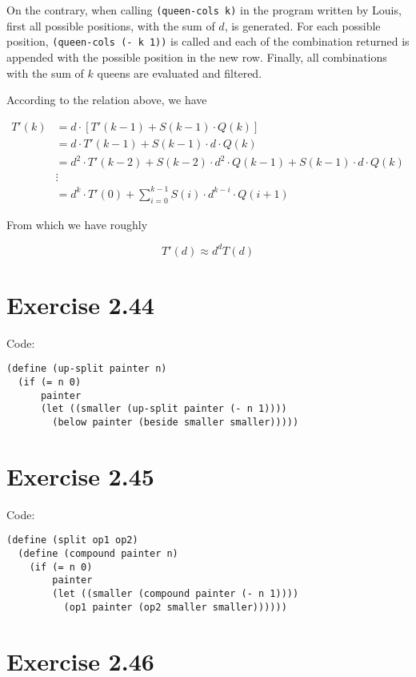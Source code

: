 \documentclass[../main.tex]{subfiles}
\begin{document}
On the contrary, when calling \lstinline{(queen-cols k)}
 in the program written by Louis, first all possible
 positions, with the sum of $d$, is generated. For each
 possible position, \lstinline{(queen-cols (- k 1))} is
 called and each of the combination returned is appended
 with the possible position in the new row. Finally,
 all combinations with the sum of $k$ queens are evaluated
 and filtered.

According to the relation above, we have

\begin{align*}
T'(k) &= d \cdot \left[T'(k-1) + S(k-1) \cdot Q(k)\right] \\
&= d \cdot T'(k-1) + S(k-1) \cdot d \cdot Q(k) \\
&= d^2 \cdot T'(k-2) + S(k-2) \cdot d^2 \cdot Q(k-1) + S(k-1) \cdot d \cdot Q(k) \\
&\vdots \\
&= d^k \cdot T'(0) + \sum_{i=0}^{k-1} S(i) \cdot d^{k-i} \cdot Q(i + 1)
\end{align*}

From which we have roughly

$$
T'(d) \approx d^d T(d)
$$

\section{Exercise 2.44}

Code:

\begin{lstlisting}
(define (up-split painter n)
  (if (= n 0)
      painter
      (let ((smaller (up-split painter (- n 1))))
        (below painter (beside smaller smaller)))))
\end{lstlisting}

\section{Exercise 2.45}

Code:

\begin{lstlisting}
(define (split op1 op2)
  (define (compound painter n)
    (if (= n 0)
        painter
        (let ((smaller (compound painter (- n 1))))
          (op1 painter (op2 smaller smaller))))))
\end{lstlisting}

\section{Exercise 2.46}
\end{document}

